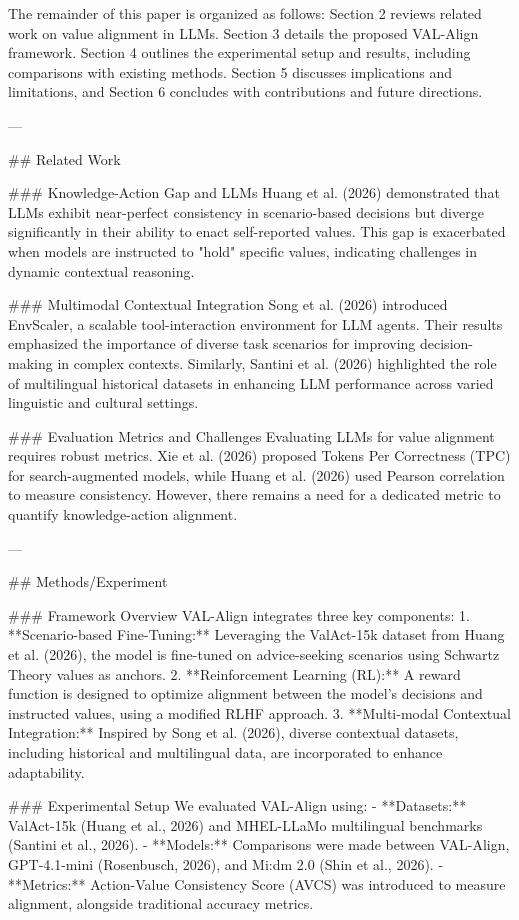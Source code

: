The remainder of this paper is organized as follows: Section 2 reviews related work on value alignment in LLMs. Section 3 details the proposed VAL-Align framework. Section 4 outlines the experimental setup and results, including comparisons with existing methods. Section 5 discusses implications and limitations, and Section 6 concludes with contributions and future directions.

---

## Related Work  

### Knowledge-Action Gap and LLMs  
Huang et al. (2026) demonstrated that LLMs exhibit near-perfect consistency in scenario-based decisions but diverge significantly in their ability to enact self-reported values. This gap is exacerbated when models are instructed to "hold" specific values, indicating challenges in dynamic contextual reasoning. 

### Multimodal Contextual Integration  
Song et al. (2026) introduced EnvScaler, a scalable tool-interaction environment for LLM agents. Their results emphasized the importance of diverse task scenarios for improving decision-making in complex contexts. Similarly, Santini et al. (2026) highlighted the role of multilingual historical datasets in enhancing LLM performance across varied linguistic and cultural settings.

### Evaluation Metrics and Challenges  
Evaluating LLMs for value alignment requires robust metrics. Xie et al. (2026) proposed Tokens Per Correctness (TPC) for search-augmented models, while Huang et al. (2026) used Pearson correlation to measure consistency. However, there remains a need for a dedicated metric to quantify knowledge-action alignment.

---

## Methods/Experiment  

### Framework Overview  
VAL-Align integrates three key components:  
1. **Scenario-based Fine-Tuning:** Leveraging the ValAct-15k dataset from Huang et al. (2026), the model is fine-tuned on advice-seeking scenarios using Schwartz Theory values as anchors.  
2. **Reinforcement Learning (RL):** A reward function is designed to optimize alignment between the model's decisions and instructed values, using a modified RLHF approach.  
3. **Multi-modal Contextual Integration:** Inspired by Song et al. (2026), diverse contextual datasets, including historical and multilingual data, are incorporated to enhance adaptability.

### Experimental Setup  
We evaluated VAL-Align using:  
- **Datasets:** ValAct-15k (Huang et al., 2026) and MHEL-LLaMo multilingual benchmarks (Santini et al., 2026).  
- **Models:** Comparisons were made between VAL-Align, GPT-4.1-mini (Rosenbusch, 2026), and Mi:dm 2.0 (Shin et al., 2026).  
- **Metrics:** Action-Value Consistency Score (AVCS) was introduced to measure alignment, alongside traditional accuracy metrics.  

